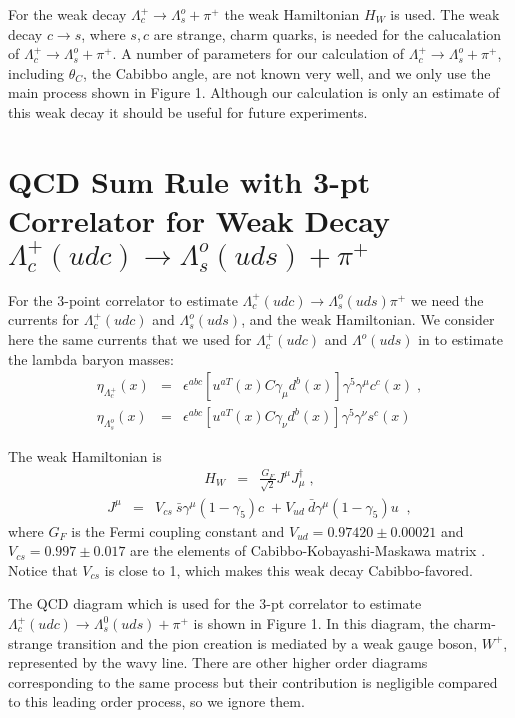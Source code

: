 \documentclass[twoside]{article}
\newcommand{\beq}{\begin{eqnarray}}
\newcommand{\eeq}{\end{eqnarray}}
\begin{document}
For the weak decay $\Lambda^+_c \rightarrow  \Lambda^o_s + \pi^+$ the weak
Hamiltonian $H_W$ is used\cite{hhk02,dgh86}. The weak decay $c \rightarrow s$,
where $s, c$ are strange, charm quarks, is needed for the calucalation of 
$\Lambda^+_c \rightarrow  \Lambda^o_s + \pi^+$.
A number of parameters for our calculation of $\Lambda^+_c 
\rightarrow  \Lambda^o_s + \pi^+$, including  $\theta_C$, the Cabibbo
angle,  are not known very well,
and we only use the main process shown in Figure 1. Although our calculation is
only an estimate of this weak decay it should be useful for future 
experiments.  

\section{QCD Sum Rule with 3-pt Correlator for Weak Decay  
$\Lambda^+_c (udc) \rightarrow  \Lambda^o_s(uds)+ \pi^+$}

For the 3-point correlator to estimate $\Lambda^+_c (udc) \rightarrow 
\Lambda^o_s(uds) \pi^+$ we need the currents for $\Lambda^+_c (udc)$ and 
$\Lambda^o_s(uds)$, and the  weak Hamiltonian. We consider here the same currents 
that we used for $\Lambda^+_c (udc)$ and $\Lambda^o(uds)$ in \cite{kb17} to 
estimate the lambda baryon masses:
\beq
\label{lambdacurrent}
\eta_{\Lambda^+_c}(x)  &=& \epsilon^{abc} [u^{aT}(x) C \gamma_\mu d^b(x)] 
\gamma^5 \gamma^\mu c^c(x) \; ,\\
\eta_{\Lambda^o_s}(x) &=& \epsilon^{abc} [u^{aT}(x) C \gamma_\nu {d}^{b}(x)]
 \gamma^5 \gamma^\nu s^c(x)  \nonumber
\eeq

\noindent
The weak Hamiltonian is 
\beq
\label{HW}
H_W &=&\frac{G_F}{\sqrt{2}}J^\mu J_\mu^\dagger\; , 
\eeq
\beq
\label{Jmu}
J^\mu &=&  V_{cs}~ \bar{s} \gamma^\mu (1-\gamma_5)c \;
+ V_{ud}~  \bar{d}\gamma^\mu(1-\gamma_5)u \;\; ,
\eeq
where $G_F$ is the Fermi coupling constant and $V_{ud}= 0.97420 \pm 0.00021$ and
$V_{cs}= 0.997 \pm 0.017$ are the elements of Cabibbo-Kobayashi-Maskawa matrix 
\cite{pdg2018}. Notice that $V_{cs}$ is close to 1, which makes this weak decay 
Cabibbo-favored. 

The QCD diagram which is used for the 3-pt correlator to estimate 
$\Lambda_c^+(udc) \rightarrow \Lambda_s^0(uds) + \pi^+$ is shown in Figure 1. 
In this diagram, the charm-strange transition and the pion creation is mediated
by a weak gauge boson, $W^+$, represented by the wavy line. There are other 
higher order diagrams corresponding to the same process but their contribution 
is negligible compared to this leading order process, so we ignore them.
\end{document}
